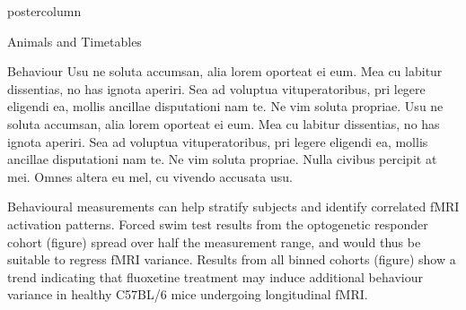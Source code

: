 \documentclass{beamer}
\begin{document}
\begin{frame}
\begin{columns}
\begin{column}{.43\textwidth}
\begin{beamercolorbox}[center]{postercolumn}
\begin{minipage}{.98\textwidth}
{\begin{myblock}{Animals and Timetables}
						\vspace{0.5em}
						\vspace{-1em}
					\end{myblock}\vfill
					\vspace{-0.3em}
					\begin{myblock}{Behaviour}
						Usu ne soluta accumsan, alia lorem oporteat ei eum.
						Mea cu labitur dissentias, no has ignota aperiri.
						Sea ad voluptua vituperatoribus, pri legere eligendi ea, mollis ancillae disputationi nam te. Ne vim soluta propriae.
						Usu ne soluta accumsan, alia lorem oporteat ei eum.
						Mea cu labitur dissentias, no has ignota aperiri.
						Sea ad voluptua vituperatoribus, pri legere eligendi ea, mollis ancillae disputationi nam te. Ne vim soluta propriae.
						Nulla civibus percipit at mei. Omnes altera eu mel, cu vivendo accusata usu.
					
						Behavioural measurements can help stratify subjects and identify correlated fMRI activation patterns.
						Forced swim test results from the optogenetic responder cohort (figure) spread over half the measurement range, and would thus be suitable to regress fMRI variance.
						Results from all binned cohorts (figure) show a trend indicating that fluoxetine treatment may induce additional behaviour variance in healthy C57BL/6 mice undergoing longitudinal fMRI.
						

\end{myblock}}
\end{minipage}
\end{beamercolorbox}
\end{column}
\end{columns}
\end{frame}
\end{document}
